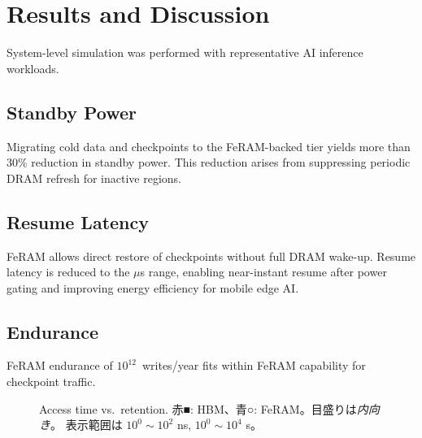 \section{Results and Discussion}
System-level simulation was performed with representative AI inference workloads.

\subsection{Standby Power}
Migrating cold data and checkpoints to the FeRAM-backed tier yields more than 30\% reduction in standby power.
This reduction arises from suppressing periodic DRAM refresh for inactive regions.

\subsection{Resume Latency}
FeRAM allows direct restore of checkpoints without full DRAM wake-up.
Resume latency is reduced to the $\mu$s range, enabling near-instant resume after power gating and improving energy efficiency for mobile edge AI.

\subsection{Endurance}
FeRAM endurance of $10^{12}$~writes/year fits within FeRAM capability for checkpoint traffic.

\begin{figure}[!t]
\centering
{}
\caption{Access time vs.\ retention. 赤■: HBM、青○: FeRAM。目盛りは\emph{内向き}。%
表示範囲は $10^0\!\sim\!10^2$ ns, $10^0\!\sim\!10^4$ s。}
\label{fig:access_retention}
\end{figure}
